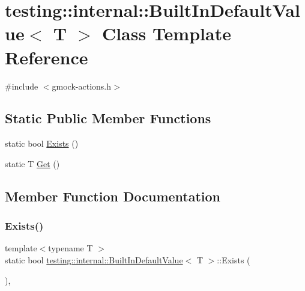 \hypertarget{classtesting_1_1internal_1_1BuiltInDefaultValue}{}\section{testing\+::internal\+::Built\+In\+Default\+Value$<$ T $>$ Class Template Reference}
\label{classtesting_1_1internal_1_1BuiltInDefaultValue}


{\ttfamily \#include $<$gmock-\/actions.\+h$>$}

\subsection*{Static Public Member Functions}
\begin{DoxyCompactItemize}
\item 
static bool \mbox{\hyperlink{classtesting_1_1internal_1_1BuiltInDefaultValue_a35207bc20a493b0efb3980eb9a08dd2f}{Exists}} ()
\item 
static T \mbox{\hyperlink{classtesting_1_1internal_1_1BuiltInDefaultValue_a7e26c1df14a887c8f393b29d6ea162e6}{Get}} ()
\end{DoxyCompactItemize}


\subsection{Member Function Documentation}
\mbox{\label{classtesting_1_1internal_1_1BuiltInDefaultValue_a35207bc20a493b0efb3980eb9a08dd2f}} 
\subsubsection{\texorpdfstring{Exists()}{Exists()}}
{\footnotesize\ttfamily template$<$typename T $>$ \\
static bool \mbox{\hyperlink{classtesting_1_1internal_1_1BuiltInDefaultValue}{testing\+::internal\+::\+Built\+In\+Default\+Value}}$<$ T $>$\+::Exists (\begin{DoxyParamCaption}{ }\end{DoxyParamCaption})\hspace{0.3cm}{\ttfamily [inline]}, {\ttfamily [static]}}

